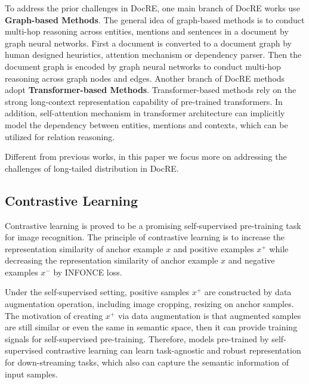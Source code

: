 \documentclass[11pt]{article}
\begin{document}
To address the prior challenges in DocRE, one main branch of DocRE works use \textbf{Graph-based Methods}\citep{sahu_inter-sentence_2019,christopoulou_connecting_2019,wang_global--local_2020,zeng_double_2020,nan_reasoning_2020,li_graph_2020,xu_discriminative_2021}. The general idea of graph-based methods is to conduct multi-hop reasoning across entities, mentions and sentences in a document by graph neural networks. First a document is converted to a document graph by human designed heuristics, attention mechanism or dependency parser. Then the document graph is encoded by graph neural networks\cite{DBLP:conf/iclr/KipfW17,NEURIPS2018_182be0c5,wu2021graph} to conduct multi-hop reasoning across graph nodes and edges. Another branch of DocRE methods adopt \textbf{Transformer-based Methods}\citep{wang_fine-tune_2019,ye_coreferential_2020, DBLP:conf/aaai/XuWLZM21, zhou_atlop_2021, zhang_docunet_2021}. Transformer-based methods rely on the strong long-context representation capability of pre-trained transformers\citep{devlin-etal-2019-bert,liu_roberta_2019}. In addition, self-attention mechanism in transformer architecture can implicitly model the dependency between entities, mentions and contexts, which can be utilized for relation reasoning\citep{zhou_atlop_2021}. 





Different from previous works, in this paper we focus more on addressing the challenges of long-tailed distribution in DocRE. 
\subsection{Contrastive Learning}
\label{sec:contrastive-learning-background}
Contrastive learning is proved to be a promising self-supervised pre-training task for image recognition\citep{pmlr-v119-chen20j,he_momentum_2020}.
The principle of contrastive learning is to increase the representation similarity of anchor example $x$ and positive examples $x^+$ while decreasing the representation similarity of anchor example $x$ and negative examples $x^-$ by INFONCE loss\citep{Oord_INFONCE_2018}. 


Under the self-supervised setting, positive samples $x^+$ are constructed by data augmentation operation, including image cropping, resizing on anchor samples. The motivation of creating $x^+$ via data augmentation is that augmented samples are still similar or even the same in semantic space, then it can provide training signals for self-supervised pre-training. Therefore, models pre-trained by self-supervised contrastive learning can learn task-agnostic and robust representation for down-streaming tasks, which also can capture the semantic information of input samples.
\end{document}
